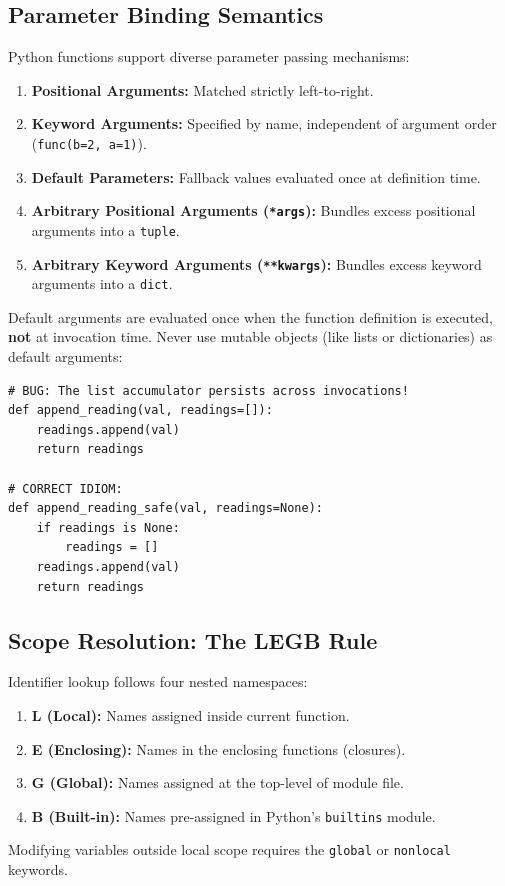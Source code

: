 \subsection{Parameter Binding Semantics}
Python functions support diverse parameter passing mechanisms:
\begin{enumerate}[leftmargin=1.8em, itemsep=3pt]
    \item \textbf{Positional Arguments:} Matched strictly left-to-right.
    \item \textbf{Keyword Arguments:} Specified by name, independent of argument order (\texttt{func(b=2, a=1)}).
    \item \textbf{Default Parameters:} Fallback values evaluated once at definition time.
    \item \textbf{Arbitrary Positional Arguments (\texttt{*args}):} Bundles excess positional arguments into a \texttt{tuple}.
    \item \textbf{Arbitrary Keyword Arguments (\texttt{**kwargs}):} Bundles excess keyword arguments into a \texttt{dict}.
\end{enumerate}

\begin{warningbox}
Default arguments are evaluated once when the function definition is executed, \textbf{not} at invocation time. Never use mutable objects (like lists or dictionaries) as default arguments:
\begin{lstlisting}
# BUG: The list accumulator persists across invocations!
def append_reading(val, readings=[]):
    readings.append(val)
    return readings

# CORRECT IDIOM:
def append_reading_safe(val, readings=None):
    if readings is None:
        readings = []
    readings.append(val)
    return readings
\end{lstlisting}
\end{warningbox}

\subsection{Scope Resolution: The LEGB Rule}
Identifier lookup follows four nested namespaces:
\begin{enumerate}[leftmargin=1.8em, itemsep=2pt]
    \item \textbf{L (Local):} Names assigned inside current function.
    \item \textbf{E (Enclosing):} Names in the enclosing functions (closures).
    \item \textbf{G (Global):} Names assigned at the top-level of module file.
    \item \textbf{B (Built-in):} Names pre-assigned in Python's \texttt{builtins} module.
\end{enumerate}
Modifying variables outside local scope requires the \texttt{global} or \texttt{nonlocal} keywords.


